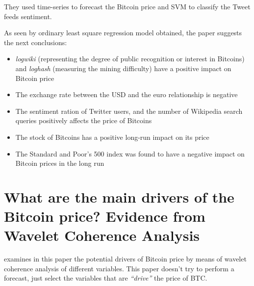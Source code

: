 They used time-series to forecast the Bitcoin price and SVM to
classify the Tweet feeds sentiment.

As seen by ordinary least square regression model obtained, the paper
suggests the next conclusions:

\begin{itemize}
\item \textit{logwiki} (representing the degree of public recognition
  or interest in Bitcoins) and \textit{loghash} (measuring the mining
  difficulty) have a positive impact on Bitcoin price 
\item The exchange rate between the USD and the euro relationship is
  negative 
\item The sentiment ration of Twitter users, and the number of
  Wikipedia search queries positively affects the price of Bitcoins
\item The stock of Bitcoins has a positive long-run impact on its
  price 
\item The Standard and Poor's 500 index was found to have a negative
  impact on Bitcoin prices in the long run
\end{itemize}

\section[\cite{kristoufek_what_2015}]{What are the main drivers of the
  Bitcoin price? Evidence from Wavelet Coherence Analysis}
\label{sec:where-are-the-main-drivers-of-the-bitcoin-price}

\cite{kristoufek_what_2015} examines in this paper the potential
drivers of Bitcoin price by means of wavelet coherence analysis of
different variables. This paper doesn't try to perform a forecast,
just select the variables that are \textit{``drive''} the price of
BTC.

